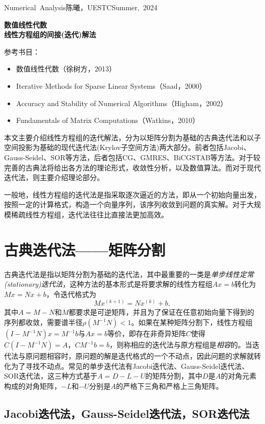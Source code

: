 \documentclass[a4paper,10pt]{ctexart}
\begin{document}
\hfill\vbox{\hbox{Numerical Analysis}\hbox{陈曦，UESTC}\hbox{Summer, 2024}}

\begin{center}\Large
    \textbf{数值线性代数}\\{\normalsize\bf {线性方程组的间接(迭代)解法}}
\end{center}
\vskip 30pt
\small {参考书目：
\begin{itemize}
    \item 数值线性代数（徐树方，2013）
    \item Iterative Methods for Sparse Linear Systems（Saad，2000）
    \item Accuracy and Stability of Numerical Algorithms（Higham，2002）
    \item Fundamentals of Matrix Computations（Watkins，2010）
\end{itemize}}

本文主要介绍线性方程组的迭代解法，分为以矩阵分割为基础的古典迭代法和以子空间投影为基础的现代迭代法(Krylov子空间方法)两大部分。前者包括Jacobi、Gauss-Seidel、SOR等方法，后者包括CG、GMRES、BiCGSTAB等方法。对于较完善的古典法将给出各方法的理论形式，收敛性分析，以及数值算法。而对于现代迭代法，则主要介绍理论部分。

一般地，线性方程组的迭代法是指采取逐次逼近的方法，即从一个初始向量出发，按照一定的计算格式，构造一个向量序列，该序列收敛到问题的真实解。对于大规模稀疏线性方程组，迭代法往往比直接法更加高效。

\section{古典迭代法——矩阵分割}
古典迭代法是指以矩阵分割为基础的迭代法，其中最重要的一类是\emph{单步线性定常(stationary)迭代法}，这种方法的基本形式是将要求解的线性方程组$Ax=b$转化为$ Mx=Nx+b $，令迭代格式为
\[
    Mx^{(k+1)} = Nx^{(k)} + b,
\]
其中$ A=M-N $和$ M $都要求是可逆矩阵，并且为了保证在任意初始向量下得到的序列都收敛，需要谱半径$ \rho(M^{-1}N)<1 $。如果在某种矩阵分割下，线性方程组$ (I-M^{-1}N)x=M^{-1}b $与$ Ax=b $等价，即存在非奇异矩阵$ C $使得$ C(I-M^{-1}N)=A $，$ CM^{-1}b = b $，则称相应的迭代法与原方程组是\emph{相容}的。当迭代法与原问题相容时，原问题的解是迭代格式的一个不动点，因此问题的求解就转化为了寻找不动点。常见的单步迭代法有Jacobi迭代法、Gauss-Seidel迭代法、SOR迭代法，这三种方式基于$ A=D-L-U $的矩阵分割，其中$ D $是$ A $的对角元素构成的对角矩阵，$ -L $和$ -U $分别是$ A $的严格下三角和严格上三角矩阵。
\subsection{Jacobi迭代法，Gauss-Seidel迭代法，SOR迭代法}   
\end{document}
